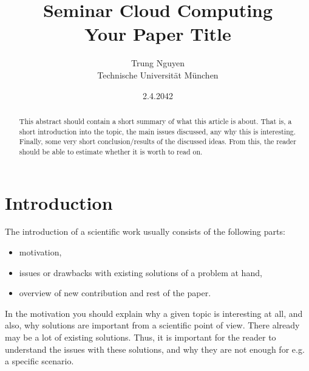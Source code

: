 \documentclass[A4,twocolumn]{article}
\author{Trung Nguyen\\ Technische Universit\"at M\"unchen}
\title{Seminar Cloud Computing \\
       {\bf Your Paper Title}
}
\date{2.4.2042}
\begin{document}
\maketitle

\begin{abstract}

This abstract should contain a short summary of what this
article is about. That is, a short introduction into the
topic, the main issues discussed, any why this is interesting.
Finally, some very short conclusion/results of the discussed
ideas. From this, the reader should be able to estimate whether
it is worth to read on.
\end{abstract}

\section{Introduction}

\label{introduction}

The introduction of a scientific work usually consists of the following
parts:

\begin{itemize}
	\item motivation,
	\item issues or drawbacks with existing solutions of a problem at 
hand,
	\item overview of new contribution and rest of the paper.
\end{itemize}

In the motivation you should explain why a given topic is interesting
at all, and also, why solutions are important from a scientific point
of view. There already may be a lot of existing solutions. Thus, it
is important for the reader to understand the issues with these solutions,
and why they are not enough for e.g. a specific scenario.
\end{document}
